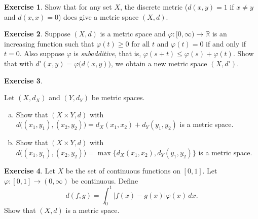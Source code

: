 \documentclass[12pt,openany]{book}
\newcommand{\abs}[1]{\left\lvert {#1} \right\rvert}
\newcommand{\R}{{\mathbb{R}}}
\newcommand{\myindex}[1]{#1\index{#1}}
\theoremstyle{plain}
\theoremstyle{remark}
\theoremstyle{definition}
\newenvironment{exbox}{%
    \def\FrameCommand{\vrule width 1pt \relax\hspace{10pt}}%
    \MakeFramed{\advance\hsize-\width\FrameRestore}%
}{%
    \endMakeFramed
}
\newenvironment{exparts}{%
    \leavevmode\begin{enumerate}[a),noitemsep,topsep=0pt,parsep=0pt,partopsep=0pt]
}{%
    \end{enumerate}
}
\theoremstyle{exercise}
\newtheorem{exercise}{Exercise}[section]
\theoremstyle{example}
\begin{document}
\begin{exbox}
\begin{exercise}
Show that for any set $X$, the discrete metric ($d(x,y) = 1$ if $x\not=y$ and
$d(x,x) = 0$) does give a metric space $(X,d)$.
\end{exercise}

\begin{exercise}
Suppose $(X,d)$ is a metric space and
$\varphi \colon [0,\infty) \to \R$ is
an increasing function such that 
$\varphi(t) \geq 0$ for all $t$ and $\varphi(t) = 0$ if and only if
$t=0$.  Also suppose $\varphi$ is \emph{\myindex{subadditive}},
that is, $\varphi(s+t) \leq \varphi(s)+\varphi(t)$.
Show that with $d'(x,y) = \varphi\bigl(d(x,y)\bigr)$, we obtain a new
metric space $(X,d')$.
\end{exercise}

\begin{exercise} \label{exercise:mscross}
\begin{samepage}
Let $(X,d_X)$ and $(Y,d_Y)$ be metric spaces.
\begin{exparts}
\item
Show that $(X \times Y,d)$ with
$d\bigl( (x_1,y_1), (x_2,y_2) \bigr) = d_X(x_1,x_2) + d_Y(y_1,y_2)$ is
a metric space.
\item
Show that $(X \times Y,d)$ with
$d\bigl( (x_1,y_1), (x_2,y_2) \bigr) = \max \{ d_X(x_1,x_2) , d_Y(y_1,y_2) \}$ is
a metric space.
\end{exparts}
\end{samepage}
\end{exercise}

\begin{exercise}
Let $X$ be the set of continuous functions on $[0,1]$.  Let $\varphi \colon
[0,1] \to (0,\infty)$ be continuous.  Define
\begin{equation*}
d(f,g) = \int_0^1 \abs{f(x)-g(x)}\varphi(x)\,dx .
\end{equation*}
Show that $(X,d)$ is a metric space.
\end{exercise}


\end{exbox}
\end{document}
